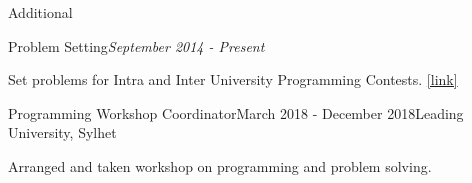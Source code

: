 \documentclass{resume}
\begin{document}

\begin{rSection}{Additional} 

\begin{rSubsection}{Problem Setting}{\em September 2014 - Present}{}{}{}
\item Set problems for Intra and Inter University Programming Contests. \href{https://toph.co/u/CLown1331/problems}{[link]}
\end{rSubsection}

\begin{rSubsection}{Programming Workshop Coordinator}{March 2018 - December 2018}{Leading University, Sylhet}{}
\item Arranged and taken workshop on programming and problem solving.
\end{rSubsection}

\end{rSection}
\end{document}
